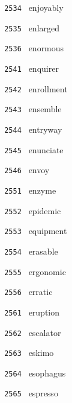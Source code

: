\documentclass[11pt]{article}
\begin{document}
\begin{multicols}{6}
\noindent \texttt{ 2534 } \hspace{1mm} enjoyably  \par
\noindent \texttt{ 2535 } \hspace{1mm} enlarged  \par
\noindent \texttt{ 2536 } \hspace{1mm} enormous  \par
\noindent \texttt{ 2541 } \hspace{1mm} enquirer  \par
\noindent \texttt{ 2542 } \hspace{1mm} enrollment  \par
\noindent \texttt{ 2543 } \hspace{1mm} ensemble  \par
\noindent \texttt{ 2544 } \hspace{1mm} entryway  \par
\noindent \texttt{ 2545 } \hspace{1mm} enunciate  \par
\noindent \texttt{ 2546 } \hspace{1mm} envoy  \par
\noindent \texttt{ 2551 } \hspace{1mm} enzyme  \par
\noindent \texttt{ 2552 } \hspace{1mm} epidemic  \par
\noindent \texttt{ 2553 } \hspace{1mm} equipment  \par
\noindent \texttt{ 2554 } \hspace{1mm} erasable  \par
\noindent \texttt{ 2555 } \hspace{1mm} ergonomic  \par
\noindent \texttt{ 2556 } \hspace{1mm} erratic  \par
\noindent \texttt{ 2561 } \hspace{1mm} eruption  \par
\noindent \texttt{ 2562 } \hspace{1mm} escalator  \par
\noindent \texttt{ 2563 } \hspace{1mm} eskimo  \par
\noindent \texttt{ 2564 } \hspace{1mm} esophagus  \par
\noindent \texttt{ 2565 } \hspace{1mm} espresso  \par

\end{multicols}
\end{document}
